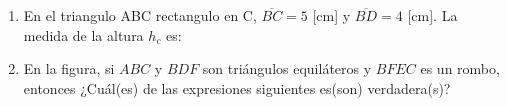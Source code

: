 \documentclass{sn-guia}
\begin{document}
\begin{enumerate}
    \item En el triangulo ABC rectangulo en C, $\overline{BC}=5$ [cm] y $\overline{BD}=4$ [cm]. La medida 
    de la altura $h_c$ es:


    \item En la figura, si $ABC$ y $BDF$ son triángulos equiláteros y $BFEC$ es un rombo, entonces 
    ¿Cuál(es) de las expresiones siguientes es(son) verdadera(s)?
    

\end{enumerate}
\end{document}
